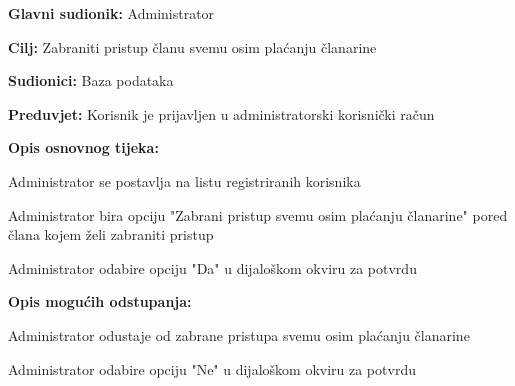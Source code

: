 		\noindent {}
		\begin{packed_item}
			
			\item \textbf{Glavni sudionik: } Administrator
			\item  \textbf{Cilj: } Zabraniti pristup članu svemu osim plaćanju članarine
			\item  \textbf{Sudionici: } Baza podataka
			\item  \textbf{Preduvjet: } Korisnik je prijavljen u administratorski korisnički račun
			\item  \textbf{Opis osnovnog tijeka:}
			
			\item[] \begin{packed_enum}
				
				\item Administrator se postavlja na listu registriranih korisnika
				\item Administrator bira opciju "Zabrani pristup svemu osim plaćanju članarine" pored člana kojem želi zabraniti pristup
				\item Administrator odabire opciju "Da" u dijaloškom okviru za potvrdu
			\end{packed_enum}
			
			\item  \textbf{Opis mogućih odstupanja:}
			
			\item[] \begin{packed_item}
				
				\item[3.a] Administrator odustaje od zabrane pristupa svemu osim plaćanju članarine
				\item[] \begin{packed_enum}
					
					\item Administrator odabire opciju "Ne" u dijaloškom okviru za potvrdu
					
				\end{packed_enum}
			\end{packed_item}
			
		\end{packed_item}
	
		\eject
		
